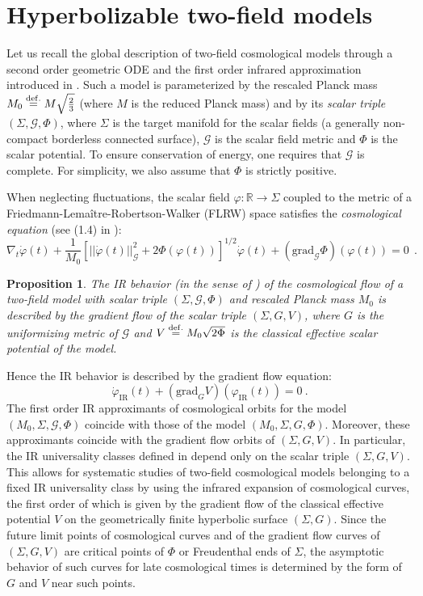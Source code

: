 \documentclass[a4paper,11pt]{article}
\theoremstyle{plain}
\newtheorem{prop}[thm]{Proposition}
\theoremstyle{definition}
\theoremstyle{remark}
\newcommand{\ben}{\begin{equation}}
\newcommand{\een}{\end{equation}}
\def\R{\mathbb{R}}
\def\cG{\mathcal{G}}
\def\IR{\mathrm{IR}}
\newcommand{\eqdef}{\stackrel{{\rm def.}}{=}}
\def\grad{\mathrm{grad}}
\begin{document}
\section{Hyperbolizable two-field models}


Let us recall the global description of two-field cosmological
models through a second order geometric ODE and the first order
infrared approximation introduced in \cite{ren}. Such a model is
parameterized by the rescaled Planck mass $M_0\eqdef
M\sqrt{\frac{2}{3}}$ (where $M$ is the reduced Planck mass) and by its
{\em scalar triple} $(\Sigma,\cG,\Phi)$, where $\Sigma$ is the target
manifold for the scalar fields (a generally non-compact borderless
connected surface), $\cG$ is the scalar field metric and $\Phi$ is the
scalar potential. To ensure conservation of energy, one requires that
$\cG$ is complete. For simplicity, we also assume that $\Phi$ is strictly positive.

When neglecting fluctuations, the scalar field $\varphi:\R\rightarrow
\Sigma$ coupled to the metric of a
Friedmann-Lema\^itre-Robertson-Walker (FLRW) space satisfies the {\em cosmological
  equation} (see (1.4) in \cite{grad}):
\ben
\label{cosm}
\nabla_t \dot{\varphi}(t)+\frac{1}{M_0} \left[||\dot{\varphi}(t)||_\cG^2+2\Phi(\varphi(t))\right]^{1/2}\dot{\varphi}(t)+
(\grad_{\cG} \Phi)(\varphi(t))=0~~.
\een


\begin{prop}
The IR behavior (in the sense of \cite{ren}) of the cosmological flow
of a two-field model with scalar triple $(\Sigma,\cG,\Phi)$ and
rescaled Planck mass $M_0$ is described by the gradient flow of the
scalar triple $(\Sigma,G,V)$, where $G$ is the uniformizing metric of
$\cG$ and $V\eqdef M_0\sqrt{2\Phi}$ is the classical effective scalar
potential of the model.
\end{prop}

\noindent Hence the IR behavior is described by the gradient flow equation:
\ben
\label{gradV}
\dot\varphi_{\IR}(t) + (\grad_{G} {V})(\varphi_{\IR}(t))=0~.
\een
The first order IR approximants of cosmological orbits for the model
$(M_0,\Sigma,\cG,\Phi)$ coincide with those of the model
$(M_0,\Sigma,G,\Phi)$. Moreover, these approximants coincide with the
gradient flow orbits of $(\Sigma,G,V)$. In particular, the IR
universality classes defined in \cite{ren} depend only on the scalar
triple $(\Sigma,G,V)$. This allows for systematic studies of two-field
cosmological models belonging to a fixed IR universality class by
using the infrared expansion of cosmological curves, the first order
of which is given by the gradient flow of the classical effective
potential $V$ on the geometrically finite hyperbolic surface
$(\Sigma,G)$. Since the future limit points of cosmological curves and
of the gradient flow curves of $(\Sigma,G,V)$ are critical points of
$\Phi$ or Freudenthal ends of $\Sigma$, the asymptotic behavior of
such curves for late cosmological times is determined by the form of
$G$ and $V$ near such points.
\end{document}

